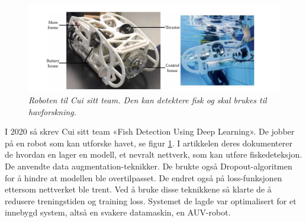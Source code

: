 \begin{figure}
\begin{center} 
\includegraphics[scale=0.45]{figures/auv}
\caption{\small \sl Roboten til Cui sitt team. Den kan detektere fisk og skal brukes til havforskning. \cite{Cui m.fl. 2020} \label{fig:auv}} 
\end{center} 
\end{figure} 

I 2020 så skrev Cui sitt team «Fish Detection Using Deep Learning». De jobber på en robot som kan utforske havet, se figur \ref{fig:auv}. I artikkelen deres dokumenterer de hvordan en lager en modell, et nevralt nettverk, som kan utføre fiskedeteksjon. De anvendte data augmentation-teknikker. De brukte også Dropout-algoritmen for å hindre at modellen ble overtilpasset. De endret også på loss-funksjonen ettersom nettverket ble trent. Ved å bruke disse teknikkene så klarte de å redusere treningstiden og training loss. Systemet de lagde var optimalisert for et innebygd system, altså en svakere datamaskin, en AUV-robot. \cite{Cui m.fl. 2020}







